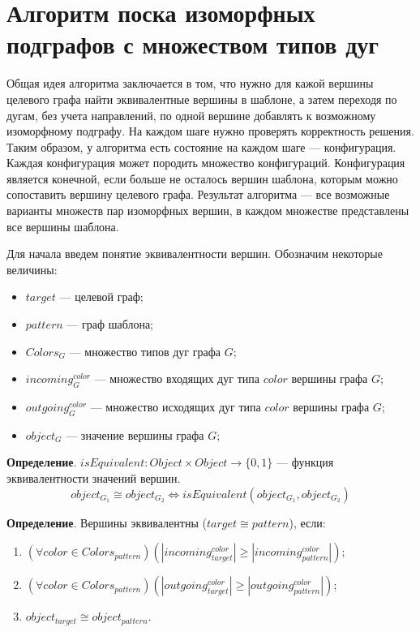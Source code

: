 \section{Алгоритм поска изоморфных подграфов с множеством типов дуг}


Общая идея алгоритма заключается в том,
что нужно для кажой вершины целевого графа найти эквивалентные вершины в шаблоне,
а затем переходя по дугам, без учета направлений,
по одной вершине добавлять к возможному изоморфному подграфу.
На каждом шаге нужно проверять корректность решения.
Таким образом, у алгоритма есть состояние на каждом шаге --- конфигурация.
Каждая конфигурация может породить множество конфигураций.
Конфигурация является конечной, если больше не осталось вершин шаблона,
которым можно сопоставить вершину целевого графа.
Результат алгоритма --- все возможные варианты множеств пар изоморфных вершин,
в каждом множестве представлены все вершины шаблона.

Для начала введем понятие эквивалентности вершин.
Обозначим некоторые величины:
\begin{itemize}
\item $target$ --- целевой граф;
\item $pattern$ --- граф шаблона;
\item $Colors_G$ --- множество типов дуг графа $G$;
\item $incoming^{color}_G$ --- множество входящих дуг типа $color$ вершины графа $G$;
\item $outgoing^{color}_G$ --- множество исходящих дуг типа $color$ вершины графа $G$;
\item $object_G$ --- значение вершины графа $G$;
\end{itemize}

\textbf{Определение}. $isEquivalent: Object \times Object \to \{ 0, 1 \}$ ---
функция эквивалентности значений вершин.
%
$$object_{G_1} \cong object_{G_2} \iff isEquivalent(object_{G_1}, object_{G_2})$$

\textbf{Определение}. Вершины эквивалентны ($target \cong pattern $), если:
\begin{enumerate}
\item $( \forall color \in Colors_{pattern} ) ( |incoming^{color}_{target}| \ge |incoming^{color}_{pattern}| )$;
\item $( \forall color \in Colors_{pattern} ) ( |outgoing^{color}_{target}| \ge |outgoing^{color}_{pattern}| )$;
\item $object_{target} \cong object_{pattern}$.
\end{enumerate}

